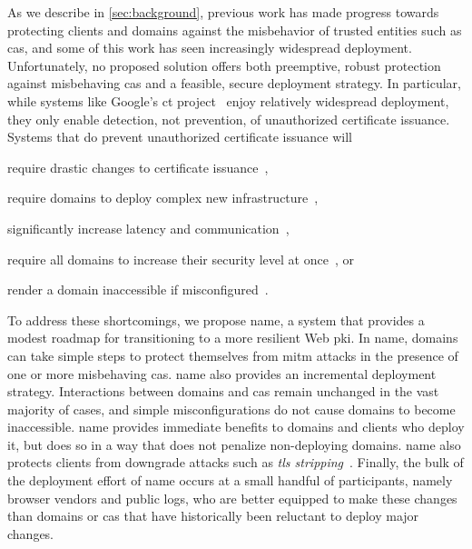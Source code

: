 As we describe in \autoref{sec:background}, previous work has made progress
towards protecting clients and domains against the misbehavior of trusted
entities such as \acp{ca}, and some of this work has seen increasingly
widespread deployment. Unfortunately, no proposed solution offers both
preemptive, robust protection against misbehaving \acp{ca} and a feasible,
secure deployment strategy. In particular, while systems like Google's \ac{ct}
project~\cite{rfc6962,ct-laurie} enjoy relatively widespread deployment, they
only enable detection, not prevention, of unauthorized certificate issuance.
Systems that do prevent unauthorized certificate issuance will
\begin{inparaenum}
\item require drastic changes to certificate issuance~\cite{kim2013accountable},
\item require domains to deploy complex new infrastructure~\cite{rfc6698,
  szalachowski2014policert},
\item significantly increase latency and communication~\cite{yu2016dtki},
\item require all domains to increase their security level at
  once~\cite{basin2014arpki}, or
\item render a domain inaccessible if misconfigured~\cite{palmer2017intent}.
\end{inparaenum}

To address these shortcomings, we propose \ac{name}, a system that provides a
modest roadmap for transitioning to a more resilient Web \ac{pki}. 
In \ac{name}, domains can take simple steps to protect themselves from
\ac{mitm} attacks in the presence of one or more misbehaving \acp{ca}.
\ac{name} also provides an incremental deployment strategy. Interactions
between domains and \acp{ca} remain unchanged in the vast majority of cases, and
simple misconfigurations do not cause domains to become inaccessible. \ac{name}
provides immediate benefits to domains and clients who deploy it, but does so in
a way that does not penalize non-deploying domains. \ac{name} also protects
clients from downgrade attacks such as \emph{\ac{tls}
stripping}~\cite{marlinspike2009new}. Finally, the bulk of the
deployment effort of \ac{name} occurs at a small handful of participants,
namely browser vendors and public logs, who are better equipped to make these
changes than domains or \acp{ca} that have historically been reluctant to deploy
major changes.

